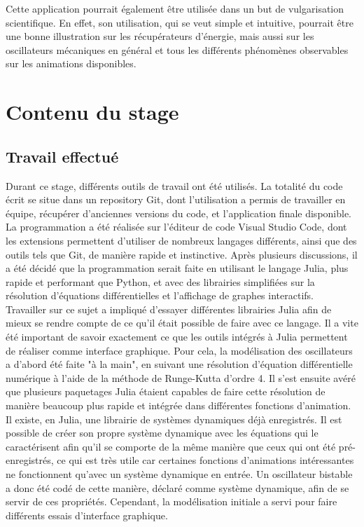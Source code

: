 \documentclass[a4paper, french, 12pt, titlepage]{article}
\begin{document}
Cette application pourrait également être utilisée dans un but de vulgarisation scientifique.
 En effet, son utilisation, qui se veut simple et intuitive, pourrait être une bonne illustration sur les récupérateurs d'énergie, mais aussi sur les oscillateurs mécaniques en général et tous les différents phénomènes observables sur les animations disponibles. \\



\newpage 

\section{Contenu du stage}


\subsection{Travail effectué}


Durant ce stage, différents outils de travail ont été utilisés.
 La totalité du code écrit se situe dans un repository Git, dont l'utilisation a permis de travailler en équipe, récupérer d'anciennes versions du code, et l'application finale disponible.
  La programmation a été réalisée sur l'éditeur de code Visual Studio Code, dont les extensions permettent d'utiliser de nombreux langages différents, ainsi que des outils tels que Git, de manière rapide et instinctive.
   Après plusieurs discussions, il a été décidé que la programmation serait faite en utilisant le langage Julia, plus rapide et performant que Python, et avec des librairies simplifiées sur la résolution d'équations différentielles et l'affichage de graphes interactifs. \\

Travailler sur ce sujet a impliqué d'essayer différentes librairies Julia afin de mieux se rendre compte de ce qu'il était possible de faire avec ce langage.
 Il a vite été important de savoir exactement ce que les outils intégrés à Julia permettent de réaliser comme interface graphique. 
 Pour cela, la modélisation des oscillateurs a d'abord été faite "à la main", en suivant une résolution d'équation différentielle numérique à l'aide de la méthode de Runge-Kutta d'ordre 4.
  Il s'est ensuite avéré que plusieurs paquetages Julia étaient capables de faire cette résolution de manière beaucoup plus rapide et intégrée dans différentes fonctions d'animation.
   Il existe, en Julia, une librairie de systèmes dynamiques déjà enregistrés. 
   Il est possible de créer son propre système dynamique avec les équations qui le caractérisent afin qu'il se comporte de la même manière que ceux qui ont été pré-enregistrés, ce qui est très utile car certaines fonctions d'animations intéressantes ne fonctionnent qu'avec un système dynamique en entrée. 
   Un oscillateur bistable a donc été codé de cette manière, déclaré comme système dynamique, afin de se servir de ces propriétés. 
   Cependant, la modélisation initiale a servi pour faire différents essais d'interface graphique. \\
\end{document}
